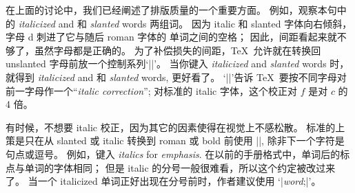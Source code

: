在上面的讨论中，我们已经阐述了排版质量的一个重要方面。%
例如，观察本句中的 {\it italicized} and 和 {\sl slanted} words 两组词。%
因为 italic 和 slanted 字体向右倾斜，字母 d 刺进了它与随后 roman 字体的%
单词之间的空格；
因此，间距看起来就不够了，虽然字母都是正确的。
为了补偿损失的间距，\TeX\ 允许就在转换回 unslanted 字母前放一个控制系列`|\/|'。
当你键入
\begintt
{\it italicized\/} and {\sl slanted\/} words
\endtt
时，就得到 {\it italicized\/} and 和 {\sl slanted\/} words, 更好看了。%
`|\/|'告诉 \TeX\ 要按不同字母对前一字母作一个``{\sl {italic correction}\/}'';
对标准的 italic 字体，这个校正对 $f$ 是对 $c$ 的 4 倍。

有时候，不想要 italic 校正，因为其它的因素使得在视觉上不感松散。%
标准的上策是只在从 slanted 或 italic 转换到 roman 或 bold 前使用 |\/|,
除非下一个字符是句点或逗号。%
例如，键入
\begintt
{\it italics\/} for {\it emphasis}.
\endtt
在以前的手册格式中，单词后的标点与单词的字体相同；
但是 italic 的分号一般很难看，所以这个约定被改过来了。%
当一个 italicized 单词正好出现在分号前时，作者建议使用 `|{\it word\/};|'。

